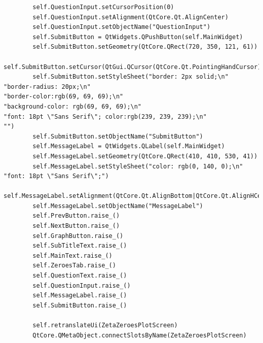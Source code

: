\documentclass[12pt]{article}
\begin{document}
\begin{lstlisting}
        self.QuestionInput.setCursorPosition(0)
        self.QuestionInput.setAlignment(QtCore.Qt.AlignCenter)
        self.QuestionInput.setObjectName("QuestionInput")
        self.SubmitButton = QtWidgets.QPushButton(self.MainWidget)
        self.SubmitButton.setGeometry(QtCore.QRect(720, 350, 121, 61))
        self.SubmitButton.setCursor(QtGui.QCursor(QtCore.Qt.PointingHandCursor))
        self.SubmitButton.setStyleSheet("border: 2px solid;\n"
"border-radius: 20px;\n"
"border-color:rgb(69, 69, 69);\n"
"background-color: rgb(69, 69, 69);\n"
"font: 18pt \"Sans Serif\"; color:rgb(239, 239, 239);\n"
"")
        self.SubmitButton.setObjectName("SubmitButton")
        self.MessageLabel = QtWidgets.QLabel(self.MainWidget)
        self.MessageLabel.setGeometry(QtCore.QRect(410, 410, 530, 41))
        self.MessageLabel.setStyleSheet("color: rgb(0, 140, 0);\n"
"font: 18pt \"Sans Serif\";")
        self.MessageLabel.setAlignment(QtCore.Qt.AlignBottom|QtCore.Qt.AlignHCenter)
        self.MessageLabel.setObjectName("MessageLabel")
        self.PrevButton.raise_()
        self.NextButton.raise_()
        self.GraphButton.raise_()
        self.SubTitleText.raise_()
        self.MainText.raise_()
        self.ZeroesTab.raise_()
        self.QuestionText.raise_()
        self.QuestionInput.raise_()
        self.MessageLabel.raise_()
        self.SubmitButton.raise_()

        self.retranslateUi(ZetaZeroesPlotScreen)
        QtCore.QMetaObject.connectSlotsByName(ZetaZeroesPlotScreen)


\end{lstlisting}
\end{document}
